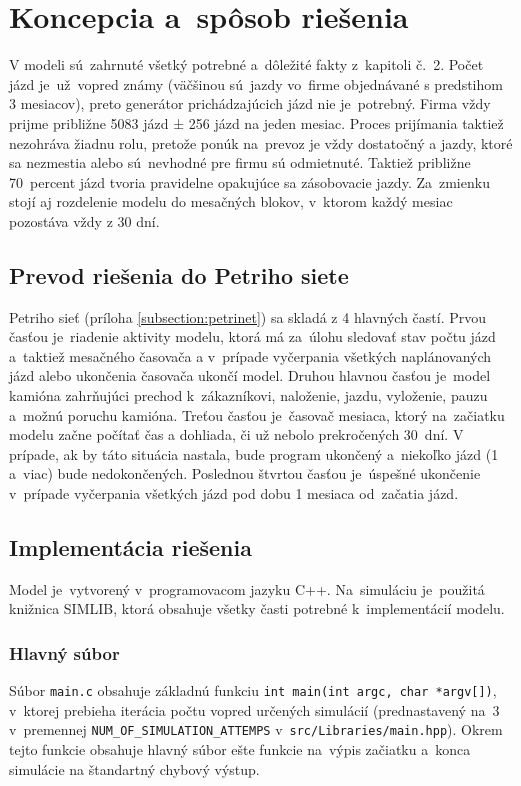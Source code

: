 \documentclass[a4paper, 11pt]{article}
\begin{document}
	\newpage
    \section{Koncepcia a~spôsob riešenia}
	V modeli sú~zahrnuté všetký potrebné a~dôležité fakty z~kapitoli
    č.~2. Počet jázd je~už~vopred známy (väčšinou sú~jazdy vo~firme objednávané
    s predstihom 3 mesiacov), preto generátor prichádzajúcich jázd nie je~potrebný.
    Firma vždy prijme približne 5083 jázd  ± 256 jázd na jeden mesiac.
    Proces prijímania taktiež nezohráva žiadnu rolu, pretože ponúk 
    na~prevoz je vždy dostatočný a jazdy, ktoré sa nezmestia alebo
    sú~nevhodné pre firmu sú odmietnuté. Taktiež približne 70~percent
    jázd tvoria pravidelne opakujúce sa zásobovacie jazdy.\newline
    Za~zmienku stojí aj rozdelenie modelu do mesačných blokov, v~ktorom
    každý mesiac pozostáva vždy z 30 dní.
    
    \subsection{Prevod riešenia do Petriho siete}
    Petriho sieť (príloha \ref{subsection:petrinet}) sa skladá z 4 hlavných častí.
    Prvou časťou je~riadenie aktivity modelu, ktorá má za~úlohu sledovať
    stav počtu jázd a~taktiež mesačného časovača a v~prípade vyčerpania všetkých
    naplánovaných jázd alebo ukončenia časovača ukončí model.
    Druhou hlavnou časťou je~model kamióna zahrňujúci prechod k~zákazníkovi,
    naloženie, jazdu, vyloženie, pauzu a~možnú poruchu kamióna.
    Treťou časťou je~časovač mesiaca, ktorý na~začiatku modelu začne
    počítať čas a dohliada, či už nebolo prekročených 30~dní.
    V prípade, ak by táto situácia nastala, bude program ukončený
    a~niekoľko jázd (1 a~viac) bude nedokončených.
    Poslednou štvrtou časťou je~úspešné ukončenie v~prípade vyčerpania
    všetkých jázd pod dobu 1 mesiaca od~začatia jázd. 

    \subsection{Implementácia riešenia}
    Model je~vytvorený v~programovacom jazyku C++. Na~simuláciu je~použitá knižnica
    SIMLIB, ktorá obsahuje všetky časti potrebné k~implementácií modelu.

    \subsubsection{Hlavný súbor}
    Súbor \texttt{main.c} obsahuje základnú funkciu \texttt{int main(int argc, char *argv[])},
    v~ktorej prebieha iterácia počtu vopred určených simulácií (prednastavený na~3
    v~premennej \texttt{NUM\_OF\_SIMULATION\_ATTEMPS} v~\texttt{src/Libraries/main.hpp}).
    Okrem tejto funkcie obsahuje hlavný súbor ešte funkcie na~výpis začiatku a~konca 
    simulácie na štandartný chybový výstup.
\end{document}
